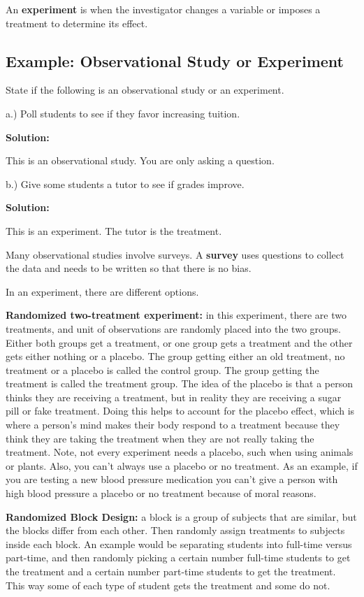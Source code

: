 \documentclass[
]{book}
\begin{document}
An \textbf{experiment} is when the investigator changes a variable or imposes a treatment to determine its effect.

\hypertarget{example-observational-study-or-experiment}{%
\subsection{Example: Observational Study or Experiment}\label{example-observational-study-or-experiment}}

State if the following is an observational study or an experiment.

a.) Poll students to see if they favor increasing tuition.

\textbf{Solution:}

This is an observational study. You are only asking a question.

b.) Give some students a tutor to see if grades improve.

\textbf{Solution:}

This is an experiment. The tutor is the treatment.

Many observational studies involve surveys. A \textbf{survey} uses questions to collect the data and needs to be written so that there is no bias.

In an experiment, there are different options.

\textbf{Randomized two-treatment experiment:} in this experiment, there are two treatments, and unit of observations are randomly placed into the two groups. Either both groups get a treatment, or one group gets a treatment and the other gets either nothing or a placebo. The group getting either an old treatment, no treatment or a placebo is called the control group. The group getting the treatment is called the treatment group. The idea of the placebo is that a person thinks they are receiving a treatment, but in reality they are receiving a sugar pill or fake treatment. Doing this helps to account for the placebo effect, which is where a person's mind makes their body respond to a treatment because they think they are taking the
treatment when they are not really taking the treatment. Note, not every experiment needs a placebo, such when using animals or plants. Also, you can't always use a placebo or no treatment. As an example, if you are testing a new blood pressure medication you can't give a person with high blood pressure a placebo or no treatment because of moral reasons.

\textbf{Randomized Block Design:} a block is a group of subjects that are similar, but the blocks differ from each other. Then randomly assign treatments to subjects inside each block. An example would be separating students into full-time versus part-time, and then randomly picking a certain number full-time students to get the treatment and a certain number part-time students to get the treatment. This way some of each type of student gets the treatment and some do not.
\end{document}
